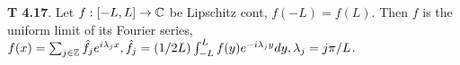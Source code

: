 {\bf T 4.17}. Let $f: [-L,L] \rightarrow \mathbb{C}$ be Lipschitz cont, $f(-L)=f(L)$. Then $f$ is the uniform limit of its Fourier series, $f(x)=\sum_{j\in \mathbb{Z}}\hat{f}_je^{i\lambda_jx}, \hat{f}_j=(1/2L)\int_{-L}^L f(y)e^{-i\lambda_jy}dy, \lambda_j=j\pi/L$. 
